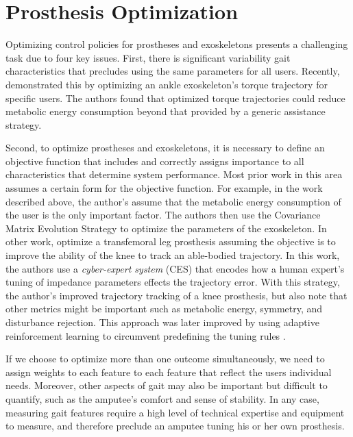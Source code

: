 \section{Prosthesis Optimization}\label{sec:back_optimization}

Optimizing control policies for prostheses and exoskeletons presents a
challenging task due to four key issues. First, there is significant
variability gait characteristics that precludes using the same parameters for
all users. Recently, \citet{zhang2017human} demonstrated this by optimizing an
ankle exoskeleton's torque trajectory for specific users.  The authors found
that optimized torque trajectories could reduce metabolic energy consumption
beyond that provided by a generic assistance strategy.
 
Second, to optimize prostheses and exoskeletons, it is necessary to define an
objective function that includes and correctly assigns importance to all
characteristics that determine system performance. Most prior work in this area
assumes a certain form for the objective function. For example, in the work
described above, the author's assume that the metabolic energy consumption of
the user is the only important factor. The authors then use the Covariance
Matrix Evolution Strategy \citep{hansen2006cma} to optimize the parameters of
the exoskeleton. In other work, \citet{huang2016cyber} optimize a transfemoral
leg prosthesis assuming the objective is to improve the ability of the knee to
track an able-bodied trajectory. In this work, the authors use a
\emph{cyber-expert system} (CES) that encodes how a human expert's tuning of
impedance parameters effects the trajectory error. With this strategy, the
author's improved trajectory tracking of a knee prosthesis, but also note that
other metrics might be important such as metabolic energy, symmetry, and
disturbance rejection. This approach was later improved by using adaptive
reinforcement learning to circumvent predefining the tuning rules
\citep{wen2016adaptive,wen2019online}. 

If we choose to optimize more than one outcome simultaneously, we need to
assign weights to each feature to each feature that reflect the users individual
needs. Moreover, other aspects of gait may also be important but difficult to
quantify, such as the amputee's comfort and sense of stability. In any case,
measuring gait features require a high level of technical expertise and
equipment to measure, and therefore preclude an amputee tuning his or her own
prosthesis.

